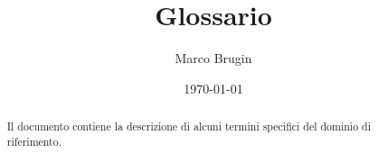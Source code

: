 \documentclass{article}
\title{Glossario}
\author{Marco Brugin}
\date{\today}
\begin{document}
\maketitle



\begin{abstract}
    

Il documento contiene la descrizione di alcuni termini specifici del dominio di riferimento.
\end{abstract}
\clearpage

\glsaddall{}
\printglossary[nonumberlist]
\end{document}
